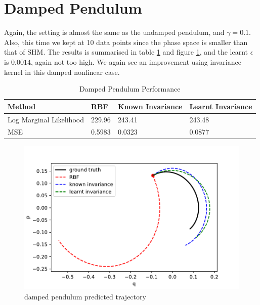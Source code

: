 \documentclass{statsmsc}
\begin{document}
\section{Damped Pendulum}
Again, the setting is almost the same as the undamped pendulum, and $\gamma=0.1$. 
Also, this time we kept at 10 data points since the phase space is smaller than that of SHM. 
The results is summarised in table \ref{tab:damped_pendulum_performance} and figure \ref{fig:damped_pendulum_prediction}, and the learnt $\epsilon$ is $0.0014$, again not too high.
We again see an improvement using invariance kernel in this damped nonlinear case. 

\begin{table}[H]
  \centering
  \begin{tabular}{l l l l}
    \hline
Method           & RBF & Known Invariance&  Learnt Invariance\\
  \hline
Log Marginal Likelihood & 229.96 & 243.41 & 243.48  \\
MSE & 0.5983 & 0.0323 & 0.0877 \\
    \hline
  \end{tabular}
  \caption{Damped Pendulum Performance}
  \label{tab:damped_pendulum_performance}
\end{table}

\begin{figure}[H]
        \centering
        \includegraphics[width=\linewidth]{../codes/figures/damped_pendulum_predicted.pdf}
        \caption{damped pendulum predicted trajectory}
        \label{fig:damped_pendulum_prediction}
\end{figure}
\end{document}
